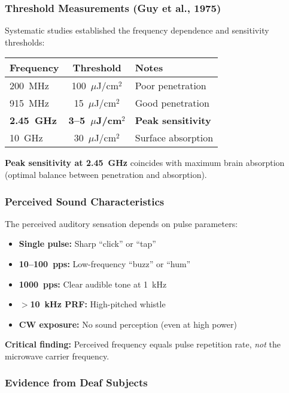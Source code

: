 \subsubsection{Threshold Measurements (Guy et al., 1975)}

Systematic studies established the frequency dependence and sensitivity thresholds:

\begin{center}
\begin{tabular}{@{}lcl@{}}
\toprule
\textbf{Frequency} & \textbf{Threshold} & \textbf{Notes} \\
\midrule
200~MHz & 100~$\mu$J/cm$^2$ & Poor penetration \\
915~MHz & 15~$\mu$J/cm$^2$ & Good penetration \\
\textbf{2.45~GHz} & \textbf{3--5~$\mu$J/cm$^2$} & \textbf{Peak sensitivity} \\
10~GHz & 30~$\mu$J/cm$^2$ & Surface absorption \\
\bottomrule
\end{tabular}
\end{center}

\textbf{Peak sensitivity at 2.45~GHz} coincides with maximum brain absorption (optimal balance between penetration and absorption).

\subsubsection{Perceived Sound Characteristics}

The perceived auditory sensation depends on pulse parameters:

\begin{itemize}
\item \textbf{Single pulse:} Sharp ``click'' or ``tap''
\item \textbf{10--100~pps:} Low-frequency ``buzz'' or ``hum''
\item \textbf{1000~pps:} Clear audible tone at 1~kHz
\item \textbf{$>$10~kHz PRF:} High-pitched whistle
\item \textbf{CW exposure:} No sound perception (even at high power)
\end{itemize}

\textbf{Critical finding:} Perceived frequency equals pulse repetition rate, \emph{not} the microwave carrier frequency.

\subsubsection{Evidence from Deaf Subjects}

